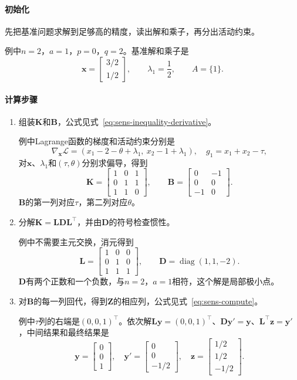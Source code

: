 \paragraph{初始化}
先把基准问题求解到足够高的精度，读出解和乘子，再分出活动约束。

例中$n=2$，$a=1$，$p=0$，$q=2$。基准解和乘子是
\[
 \bm{x}=\begin{bmatrix}3/2\\1/2\end{bmatrix},\qquad\lambda_1=\frac12,\qquad A=\{1\}.
\]

\paragraph{计算步骤}
\begin{enumerate}
 \item 组装$\bm{K}$和$\bm{B}$，公式见式~\eqref{eq:sens-inequality-derivative}。

 例中Lagrange函数的梯度和活动约束分别是
 \[
  \nabla_{\bm{x}}\mathcal{L}=(x_1-2-\theta+\lambda_1,\ x_2-1+\lambda_1),\quad g_1=x_1+x_2-\tau,
 \]
 对$\bm{x}$、$\lambda_1$和$(\tau,\theta)$分别求偏导，得到
 \[
  \bm{K}=\begin{bmatrix}1&0&1\\0&1&1\\1&1&0\end{bmatrix},\qquad
  \bm{B}=\begin{bmatrix}0&-1\\0&0\\-1&0\end{bmatrix}.
 \]
 $\bm{B}$的第一列对应$\tau$，第二列对应$\theta$。

 \item 分解$\bm{K}=\bm{L}\bm{D}\bm{L}^{\top}$，并由$\bm{D}$的符号检查惯性。

 例中不需要主元交换，消元得到
 \[
  \bm{L}=\begin{bmatrix}1&0&0\\0&1&0\\1&1&1\end{bmatrix},\qquad
  \bm{D}=\operatorname{diag}(1,1,-2).
 \]
 $\bm{D}$有两个正数和一个负数，与$n=2$，$a=1$相符，这个解是局部极小点。

 \item 对$\bm{B}$的每一列回代，得到$\bm{Z}$的相应列，公式见式~\eqref{eq:sens-compute}。

 例中$\tau$列的右端是$(0,0,1)^{\top}$。依次解$\bm{L}\bm{y}=(0,0,1)^{\top}$、$\bm{D}\bm{y}'=\bm{y}$、$\bm{L}^{\top}\bm{z}=\bm{y}'$，中间结果和最终结果是
 \[
  \bm{y}=\begin{bmatrix}0\\0\\1\end{bmatrix},\quad
  \bm{y}'=\begin{bmatrix}0\\0\\-1/2\end{bmatrix},\quad
  \bm{z}=\begin{bmatrix}1/2\\1/2\\-1/2\end{bmatrix}.
 \]


\end{enumerate}
